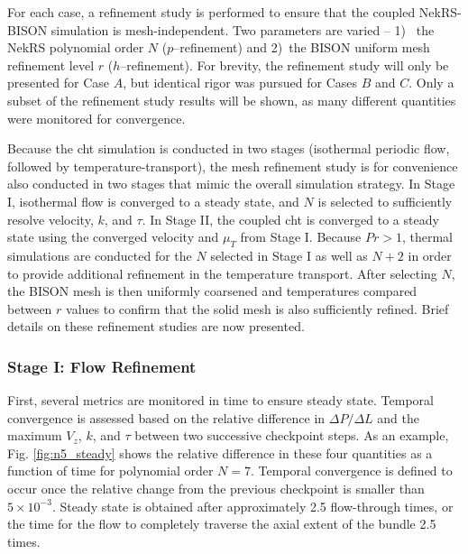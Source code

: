 \documentclass[3p,,preprint,11pt]{elsarticle}
\begin{document}
For each case, a refinement study is performed to ensure that the coupled NekRS-BISON simulation is mesh-independent. Two parameters are varied -- 1)~ the NekRS polynomial order $N$ ($p$--refinement) and 2)~the BISON uniform mesh refinement level $r$ ($h$--refinement). 
For brevity, the refinement study will only be presented for Case $A$, but identical rigor was pursued for Cases $B$ and $C$. Only a subset of the refinement study results will be shown, as many different quantities were monitored for convergence.

Because the \gls{cht} simulation is conducted in two stages (isothermal periodic flow, followed by temperature-transport), the mesh refinement study is for convenience also conducted in two stages that mimic the overall simulation strategy. In Stage I, isothermal flow is converged to a steady state, and $N$ is selected to sufficiently resolve velocity, $k$, and $\tau$. In Stage II, the coupled \gls{cht} is converged to a steady state using the converged velocity and $\mu_T$ from Stage I. Because $Pr>1$, thermal simulations are conducted for the $N$ selected in Stage I as well as $N+2$ in order to provide additional refinement in the temperature transport. After selecting $N$, the BISON mesh is then uniformly coarsened and temperatures compared between $r$ values to confirm that the solid mesh is also sufficiently refined. Brief details on these refinement studies are now presented.


\subsubsection{Stage I: Flow Refinement}

First, several metrics are monitored in time to ensure steady state. Temporal convergence is assessed based on the relative difference in $\Delta P/\Delta L$ and the maximum $V_z$, $k$, and $\tau$ between two successive checkpoint steps. 
As an example, Fig. \ref{fig:n5_steady} shows the relative difference in these four quantities as a function of time for polynomial order $N=7$. Temporal convergence is defined to occur once the relative change from the previous checkpoint is smaller than $5\times10^{-3}$. Steady state is obtained after approximately 2.5 flow-through times, or the time for the flow to completely traverse the axial extent of the bundle 2.5 times.
\end{document}
